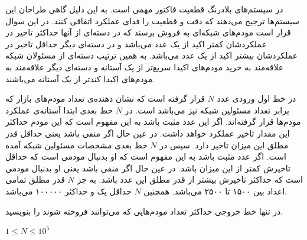 \documentclass[11.5pt,a4paper,oneside]{article}
\begin{document}
\def\problemCode{Realtime}
\def\problemEnglishTitle{Realtime Network}
\def\problemFarsiTitle{شبکه‌های بلادرنگ}
\def\timeLimit{$1$ \second}
\def\memLimit{$32$ \megabytes}
\begin{problem}
در سیستم‌های بلادرنگ قطعیت فاکتور مهمی است. به این دلیل گاهی طراحان این سیستم‌ها ترجیح می‌دهند که دقت و قطعیت را فدای عملکرد اتفاقی کنند. در این سوال قرار است مودم‌های شبکه‌ای به فروش برسند که در دسته‌ای از آنها حداکثر تاخیر در عملکردشان کمتر اکید از یک عدد می‌باشد و در دسته‌ای دیگر حداقل تاخیر در عملکردشان بیشتر اکید از یک عدد می‌باشد. به همین ترتیب دسته‌ای از مسئولان شبکه علاقه‌مند به خرید مودم‌های اکیدا سریع‌تر از یک آستانه و دسته‌ای دیگر علاقه‌مند به مودم‌های اکیدا کند‌تر از یک آستانه می‌باشند.

در خط اول ورودی عدد $N$ قرار گرفته است که نشان دهنده‌ی تعداد مودم‌های بازار که برابر تعداد مسئولین شبکه نیز می‌باشد است. در $N$  خط بعدی ابتدا آستانه‌ی عملکرد مودم‌ها قرار گرفته‌اند. اگر این عدد مثبت باشد به این مفهوم است که این مودم حداکثر این مقدار تاخیر عملکرد خواهد داشت. در عین حال اگر منفی باشد یعنی حداقل قدر مطلق این میزان تاخیر دارد.
سپس در $N$ خط بعدی مشخصات مسئولین شبکه آمده است. اگر عدد مثبت باشد به این مفهوم است که او بدنبال مودمی است که حداقل تاخیرش کمتر از این میزان باشد. در عین حال اگر منفی باشد یعنی او بدنبال مودمی است که حداکثر تاخیرش بیشتر از قدر مطلق این عدد باشد.
به جز $N$ قدر مطلق تمامی اعداد بین ۱۵۰۰ تا ۲۵۰۰ می‌باشد. همچنین $N$ حداقل یک و حداکثر ۱۰۰۰۰۰ می‌باشد.

\outputDescription
در تنها خط خروجی حداکثر تعداد مودم‌هایی که می‌توانند فروخته شوند را بنویسید.

\constraints
\begin{shortitems}
\item $1 \le N \le 10^5$
\end{shortitems}

\sampleIO

\begin{example}
%
%
%
\end{example}



\end{problem}
\end{document}
